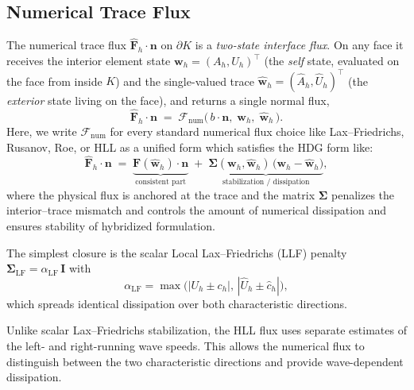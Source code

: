 \documentclass[11pt]{article}
\begin{document}
\subsection{Numerical Trace Flux}
The numerical trace flux $\widehat{\mathbf F}_h\cdot\bm n$ on $\partial K$ is a
\emph{two-state interface flux}. On any face it receives the interior element
state $\mathbf w_h=(A_h,U_h)^\top$ (the \emph{self} state, evaluated on the face
from inside $K$) and the single-valued trace $\widehat{\mathbf w}_h=(\widehat
A_h,\widehat U_h)^\top$ (the \emph{exterior} state living on the face), and
returns a single normal flux,
\begin{equation}
  \widehat{\mathbf F}_h\cdot\bm n
  \;=\;
  \mathcal F_{\mathrm{num}}\bigl(\,b\!\cdot\!\bm n,\;\mathbf w_h,\;
  \widehat{\mathbf w}_h\,\bigr).
  \label{eq:numflux_two_state}
\end{equation}
Here, we write $\mathcal F_{\mathrm{num}}$ for every standard numerical flux choice like Lax--Friedrichs, Rusanov, Roe, or HLL as a unified form which satisfies the HDG form like:
\begin{equation}
  \widehat{\mathbf F}_h\cdot\bm n
  \;=\;
  \underbrace{\mathbf F(\widehat{\mathbf w}_h)\cdot\bm n}_{\text{consistent part}}
  \;+\;
  \underbrace{\bm\Sigma(\mathbf w_h,\widehat{\mathbf w}_h)\,
  \bigl(\mathbf w_h-\widehat{\mathbf w}_h\bigr)}_{\text{stabilization / dissipation}},
  \label{eq:hdg_template}
\end{equation}
where the physical flux is anchored at the trace and the matrix
$\bm\Sigma$ penalizes the interior--trace mismatch and controls the amount of numerical dissipation and ensures stability of hybridized formulation.

The simplest closure is the scalar Local Lax--Friedrichs (LLF) penalty
$\bm\Sigma_{\mathrm{LF}}=\alpha_{\mathrm{LF}}\,\mathbf I$ with
$$\alpha_{\mathrm{LF}}=\max\bigl(|U_h\pm c_h|,\,|\widehat U_h\pm\widehat
c_h|\bigr),$$ which spreads identical dissipation over both characteristic
directions. 

Unlike scalar Lax–Friedrichs stabilization, the HLL flux uses separate estimates of the left- and right-running wave speeds. This allows the numerical flux to distinguish between the two characteristic directions and provide wave-dependent dissipation.
\end{document}
